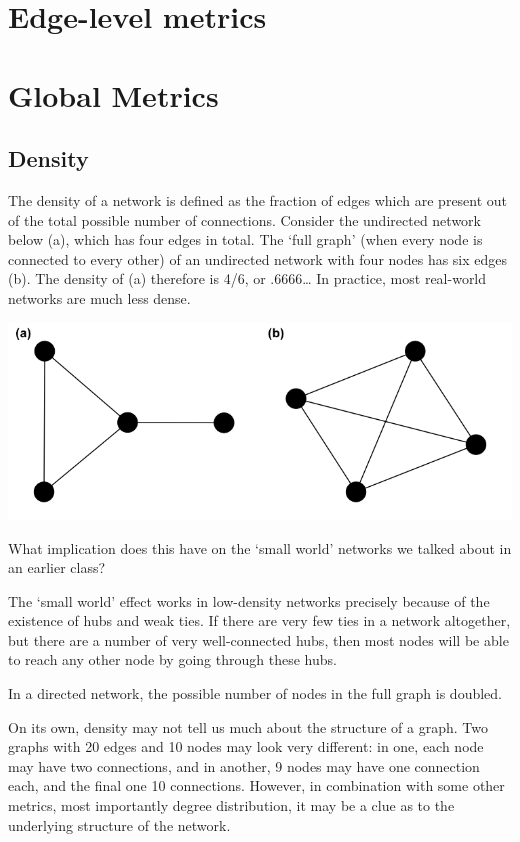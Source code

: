 \documentclass[
]{book}
\begin{document}
\hypertarget{edge-level-metrics}{%
\section{Edge-level metrics}\label{edge-level-metrics}}

\hypertarget{global-metrics}{%
\section{Global Metrics}\label{global-metrics}}

\hypertarget{density}{%
\subsection{Density}\label{density}}

The density of a network is defined as the fraction of edges which are present out of the total possible number of connections. Consider the undirected network below (a), which has four edges in total. The `full graph' (when every node is connected to every other) of an undirected network with four nodes has six edges (b). The density of (a) therefore is 4/6, or .6666\ldots{} In practice, most real-world networks are much less dense.

\includegraphics{images/density.png}

What implication does this have on the `small world' networks we talked about in an earlier class?

The `small world' effect works in low-density networks precisely because of the existence of hubs and weak ties. If there are very few ties in a network altogether, but there are a number of very well-connected hubs, then most nodes will be able to reach any other node by going through these hubs.

In a directed network, the possible number of nodes in the full graph is doubled.

On its own, density may not tell us much about the structure of a graph. Two graphs with 20 edges and 10 nodes may look very different: in one, each node may have two connections, and in another, 9 nodes may have one connection each, and the final one 10 connections. However, in combination with some other metrics, most importantly degree distribution, it may be a clue as to the underlying structure of the network.
\end{document}
